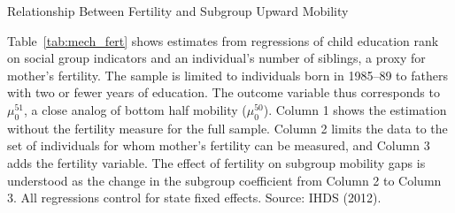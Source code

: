 \begin{table}[H]
  \caption{Relationship Between Fertility and Subgroup Upward Mobility}
  \label{tab:mech_fert}
  
  
  \footnotesize{Table~\ref{tab:mech_fert} shows estimates from
    regressions of child education rank on social group indicators and
    an individual's number of siblings, a proxy for mother's
    fertility. The sample is limited to individuals born in 1985--89
    to fathers with two or fewer years of education. The outcome
    variable thus corresponds to $\mu_0^{51}$, a close analog of
    bottom half mobility ($\mu_0^{50}$). Column 1 shows the estimation
    without the fertility measure for the full sample. Column 2 limits
    the data to the set of individuals for whom mother's fertility can
    be measured, and Column 3 adds the fertility variable. The effect
    of fertility on subgroup mobility gaps is understood as the change
    in the subgroup coefficient from Column 2 to Column 3. All
    regressions control for state fixed effects. Source: IHDS (2012).}
\end{table}

